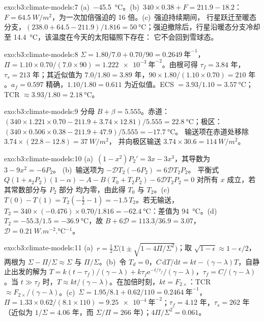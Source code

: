 \begin{solution}{exo:b3:climate-models:7}
(a)~\qty{-45.5}{\celsius}。(b)~$340\times0.38 + F = 211.9 - 18.2$：$F =
\qty{64.5}{W/m^2}$，为一次加倍强迫的 16 倍。(c)~强迫持续期间，
行星跃迁至暖态分支，$(238.0 + 64.5 -
211.9)/1.816 = \qty{50}{\celsius}$；强迫撤除后，行星沿暖态分支冷却
至 \qty{14.4}{\celsius}，该温度在今天的太阳辐照下存在：
它不会回到雪球态。
\end{solution}

\begin{solution}{exo:b3:climate-models:8}
$\Sigma = 1.80/7.0 + 0.70/90 = \qty{0.2649}{\text{年}^{-1}}$，$\Pi = 1.10\times0.70/
(7.0\times90) = \qty{1.222e-3}{\text{年}^{-2}}$。由根可得 $\tau_f =
\num{3.84}\text{ 年}$，$\tau_s = \num{213}\text{ 年}$；其近似值为
$7.0/1.80 = \num{3.89}\text{ 年}$，$90\times1.80/(1.10\times0.70) =
\num{210}\text{ 年}$。$a_f = 0.597$ 精确，$1.10/1.80 = 0.611$
为近似值。ECS $= 3.93/1.10 = \qty{3.57}{\celsius}$；TCR $\approx
3.93/1.80 = \qty{2.18}{\celsius}$。
\end{solution}

\begin{solution}{exo:b3:climate-models:9}
分母 $B + \beta = \num{5.555}$。赤道：$(340\times1.221\times0.70 -
211.9 + 3.74\times12.81)/5.555 = \qty{22.8}{\celsius}$；极区：
$(340\times0.506\times0.38 - 211.9 + 47.9)/5.555 = \qty{-17.7}{\celsius}$。
输送项在赤道处移除 $3.74\times(22.8 - 12.8) = \qty{37}{W/m^2}$，
并向极区输送 $3.74\times30.6 = \qty{114}{W/m^2}$。
\end{solution}

\begin{solution}{exo:b3:climate-models:10}
(a)~$(1 - x^2)P_2' = 3x - 3x^3$，其导数为 $3 - 9x^2 = -6P_2$。
(b)~输送项为 $-\mathcal D T_2(-6P_2) = 6\mathcal DT_2P_2$。
平衡式 $Q(1 + s_2P_2)(1 - \alpha) - A - B(T_0 + T_2P_2) - 6\mathcal
DT_2P_2 = 0$ 对所有 $x$ 成立，若其常数部分与 $P_2$ 部分
均为零，由此得 $T_0$ 与 $T_2$。(c)~$T(0) - T(1) = T_2(-\tfrac12 - 1)
= -1.5\,T_2$。若无输送，$T_2 = 340\times(-0.476)\times0.70/1.816 =
\qty{-62.4}{\celsius}$：差值为 \qty{94}{\celsius}。(d)~$T_2 =
-55.3/1.5 = \qty{-36.9}{\celsius}$，故 $B + 6\mathcal D = 113.3/36.9 =
3.07$，$\mathcal D = \qty{0.21}{W.m^{-2}.\celsius^{-1}}$。
\end{solution}

\begin{solution}{exo:b3:climate-models:11}
(a)~$r = \tfrac12\Sigma\big(1 \pm \sqrt{1 - 4\Pi/\Sigma^2}\big)$；取
$\sqrt{1 - \epsilon} \approx 1 - \epsilon/2$，两根为 $\Sigma -
\Pi/\Sigma \approx \Sigma$ 与 $\Pi/\Sigma$。(b)~令 $T_d = 0$，$C\,\mathrm
dT/\mathrm dt = kt - (\gamma - \lambda)T$，自静止出发的解为 $T =
k(t - \tau_f)/(\gamma - \lambda) + k\tau_f\mathrm e^{-t/\tau_f}/(\gamma -
\lambda)$，$\tau_f = C/(\gamma - \lambda)$。当 $t \gg \tau_f$ 时，$T \approx
kt/(\gamma - \lambda)$。在加倍时刻，$kt = F_{2\times}$：TCR
$\approx F_{2\times}/(\gamma - \lambda)$。(c)~$\Sigma = 1.95/8.1 +
0.62/110 = \qty{0.2464}{\text{年}^{-1}}$，$\Pi = 1.33\times0.62/(8.1\times110) =
\qty{9.25e-4}{\text{年}^{-2}}$；$\tau_f = \num{4.12}\text{ 年}$，$\tau_s =
\num{262}\text{ 年}$（近似为 $1/\Sigma = \num{4.06}\text{ 年}$，而
$\Sigma/\Pi = \num{266}\text{ 年}$）；$4\Pi/\Sigma^2 = 0.061$。
\end{solution}

